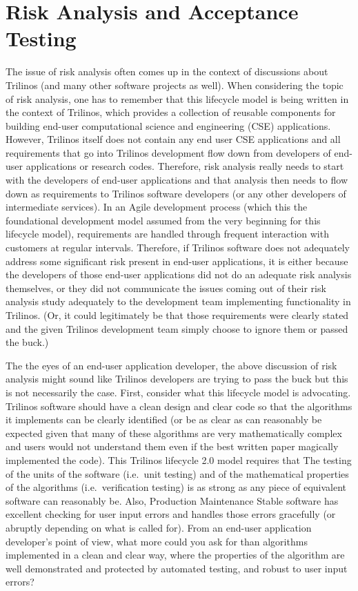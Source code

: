 \documentclass[11pt]{SANDreport}
\begin{document}
%
{}\section{Risk Analysis and Acceptance Testing}
\label{sec:risk_analysis_acceptance_testing}
%

The issue of risk analysis often comes up in the context of discussions
about Trilinos (and many other software projects as well).  When
considering the topic of risk analysis, one has to remember that this
lifecycle model is being written in the context of Trilinos, which
provides a collection of reusable components for building end-user
computational science and engineering (CSE) applications.  However,
Trilinos itself does not contain any end user CSE applications and all
requirements that go into Trilinos development flow down from
developers of end-user applications or research codes.  Therefore,
risk analysis really needs to start with the developers of end-user
applications and that analysis then needs to flow down as requirements
to Trilinos software developers (or any other developers of
intermediate services).  In an Agile development process (which this
the foundational development model assumed from the very beginning for
this lifecycle model), requirements are handled through frequent
interaction with customers at regular intervals.  Therefore, if
Trilinos software does not adequately address some significant risk
present in end-user applications, it is either because the developers
of those end-user applications did not do an adequate risk analysis
themselves, or they did not communicate the issues coming out of their
risk analysis study adequately to the development team implementing
functionality in Trilinos.  (Or, it could legitimately be that those
requirements were clearly stated and the given Trilinos development
team simply choose to ignore them or passed the buck.)

The the eyes of an end-user application developer, the above
discussion of risk analysis might sound like Trilinos developers are
trying to pass the buck but this is not necessarily the case.  First,
consider what this lifecycle model is advocating.  Trilinos software
should have a clean design and clear code so that the algorithms it
implements can be clearly identified (or be as clear as can reasonably
be expected given that many of these algorithms are very
mathematically complex and users would not understand them even if the
best written paper magically implemented the code).  This Trilinos
lifecycle 2.0 model requires that The testing of the units of the
software (i.e.\ unit testing) and of the mathematical properties of
the algorithms (i.e.\ verification testing) is as strong as any piece
of equivalent software can reasonably be.  Also, Production
Maintenance Stable software has excellent checking for user input
errors and handles those errors gracefully (or abruptly depending on
what is called for).  From an end-user application developer's point
of view, what more could you ask for than algorithms implemented in a
clean and clear way, where the properties of the algorithm are well
demonstrated and protected by automated testing, and robust to user
input errors?
\end{document}
